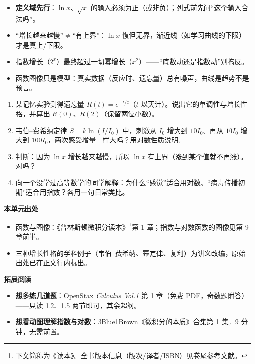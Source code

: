 \documentclass[UTF8,a4paper,11pt]{ctexart}
\begin{document}
\begin{calcbox}[易错点与失效边界]
\begin{itemize}
  \item \textbf{定义域先行}：$\ln x$、$\sqrt{x}$ 的输入必须为正（或非负）；列式前先问“这个输入合法吗”。
  \item “增长越来越慢”$\neq$“有上界”：$\ln x$ 慢但无界，渐近线（如学习曲线的下限）才是真上/下限。
  \item 指数增长（$2^{x}$）最终超过一切幂增长（$x^{2}$）——“底数动还是指数动”别搞反。
  \item 函数图像只是模型：真实数据（反应时、遗忘量）总有噪声，曲线是趋势不是预言。
\end{itemize}
\end{calcbox}

\begin{exercise}[今日自测]
\begin{enumerate}
  \item 某记忆实验测得遗忘量 $R(t)=e^{-t/2}$（$t$ 以天计）。说出它的单调性与增长性格，并算出 $R(0)$、$R(2)$（保留两位小数）。
  \item 韦伯–费希纳定律 $S=k\ln(I/I_0)$ 中，刺激从 $I_0$ 增大到 $10I_0$、再从 $10I_0$ 增大到 $100I_0$，两次感受增量一样大吗？用对数性质说明。
  \item 判断：因为 $\ln x$ 增长越来越慢，所以 $\ln x$ 有上界（涨到某个值就不再涨）。对吗？
  \item 向一个没学过高等数学的同学解释：为什么“感觉”适合用对数、“病毒传播初期”适合用指数？各用一句日常类比。
\end{enumerate}
\end{exercise}

\begin{reading}
\textbf{本单元出处}
\begin{itemize}
  \item 函数与图像：《普林斯顿微积分读本》\footnote{下文简称为《读本》。全书版本信息（版次/译者/ISBN）见卷尾参考文献。}第 1 章；指数与对数函数的图像见第 9 章前半。
  \item 三种增长性格的学科例子（韦伯–费希纳、幂定律、复利）为讲义改编，原始出处已在正文行内标出。
\end{itemize}
\textbf{拓展阅读}
\begin{itemize}
  \item \textbf{想多练几道题}：OpenStax \emph{Calculus Vol.1} 第 1 章（免费 PDF，奇数题附答）——只读 1.2、1.5 两节即可，其余超纲。
  \item \textbf{想看动图理解指数与对数}：3Blue1Brown《微积分的本质》合集第 1 集，9 分钟，无需前置。
\end{itemize}
\end{reading}
\end{document}
